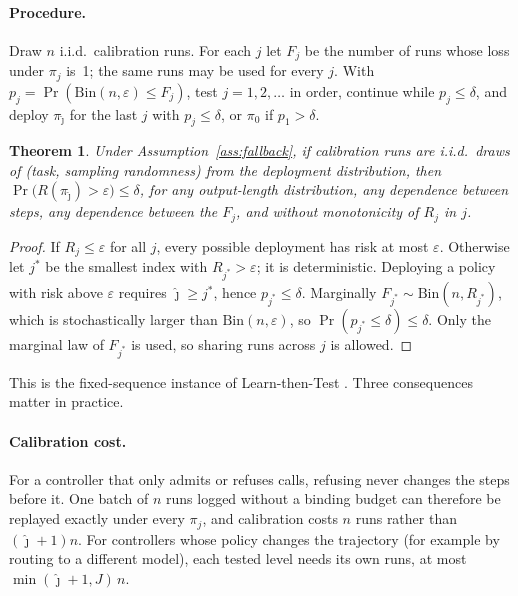 \documentclass[11pt]{article}
\newtheorem{theorem}{Theorem}
\theoremstyle{remark}
\begin{document}
\paragraph{Procedure.}
Draw $n$ i.i.d.\ calibration runs. For each $j$ let $F_j$ be the number of runs
whose loss under $\pi_j$ is~1; the same runs may be used for every $j$. With
$p_j = \Pr(\mathrm{Bin}(n,\varepsilon) \le F_j)$, test $j = 1, 2, \dots$ in
order, continue while $p_j \le \delta$, and deploy $\pi_{\hat\jmath}$ for the
last $j$ with $p_j \le \delta$, or $\pi_0$ if $p_1 > \delta$.

\begin{theorem}\label{thm:main}
Under Assumption~\ref{ass:fallback}, if calibration runs are i.i.d.\ draws of
(task, sampling randomness) from the deployment distribution, then
$\Pr\bigl(R(\pi_{\hat\jmath}) > \varepsilon\bigr) \le \delta$, for any
output-length distribution, any dependence between steps, any dependence
between the $F_j$, and without monotonicity of $R_j$ in $j$.
\end{theorem}
\begin{proof}
If $R_j \le \varepsilon$ for all $j$, every possible deployment has risk at most
$\varepsilon$. Otherwise let $j^\ast$ be the smallest index with
$R_{j^\ast} > \varepsilon$; it is deterministic. Deploying a policy with risk
above $\varepsilon$ requires $\hat\jmath \ge j^\ast$, hence $p_{j^\ast} \le
\delta$. Marginally $F_{j^\ast} \sim \mathrm{Bin}(n, R_{j^\ast})$, which is
stochastically larger than $\mathrm{Bin}(n,\varepsilon)$, so
$\Pr(p_{j^\ast} \le \delta) \le \delta$. Only the marginal law of $F_{j^\ast}$
is used, so sharing runs across $j$ is allowed.
\end{proof}

This is the fixed-sequence instance of Learn-then-Test
\citep{angelopoulos2021ltt}. Three consequences matter in practice.

\paragraph{Calibration cost.}
For a controller that only admits or refuses calls, refusing never changes the
steps before it. One batch of $n$ runs logged without a binding budget can
therefore be replayed exactly under every $\pi_j$, and calibration costs $n$
runs rather than $(\hat\jmath + 1)n$. For controllers whose policy changes the
trajectory (for example by routing to a different model), each tested level
needs its own runs, at most $\min(\hat\jmath+1, J)\,n$.
\end{document}
